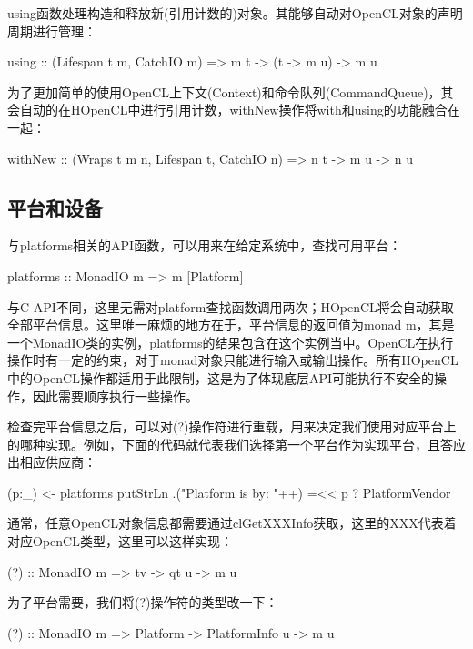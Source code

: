 using函数处理构造和释放新(引用计数的)对象。其能够自动对OpenCL对象的声明周期进行管理：

\begin{codebox}[haskell]
using :: (Lifespan t m, CatchIO m) => m t -> (t -> m u) -> m u
\end{codebox}

为了更加简单的使用OpenCL上下文(Context)和命令队列(CommandQueue)，其会自动的在HOpenCL中进行引用计数，withNew操作将with和using的功能融合在一起：

\begin{codebox}[haskell]
withNew :: (Wraps t m n, Lifespan t, CatchIO n) => n t -> m u -> n u
\end{codebox}

\subsection{平台和设备}

与platforms相关的API函数，可以用来在给定系统中，查找可用平台：

\begin{codebox}[haskell]
platforms :: MonadIO m => m [Platform]
\end{codebox}

与C API不同，这里无需对platform查找函数调用两次；HOpenCL将会自动获取全部平台信息。这里唯一麻烦的地方在于，平台信息的返回值为monad m，其是一个MonadIO类的实例，platforms的结果包含在这个实例当中。OpenCL在执行操作时有一定的约束，对于monad对象只能进行输入或输出操作。所有HOpenCL中的OpenCL操作都适用于此限制，这是为了体现底层API可能执行不安全的操作，因此需要顺序执行一些操作。

检查完平台信息之后，可以对(?)操作符进行重载，用来决定我们使用对应平台上的哪种实现。例如，下面的代码就代表我们选择第一个平台作为实现平台，且答应出相应供应商：

\begin{codebox}[haskell]
(p:_) <- platforms
putStrLn .("Platform is by: "++) =<< p ? PlatformVendor
\end{codebox}

通常，任意OpenCL对象信息都需要通过clGetXXXInfo获取，这里的XXX代表着对应OpenCL类型，这里可以这样实现：

\begin{codebox}[haskell]
(?) :: MonadIO m => tv -> qt u -> m u
\end{codebox}

为了平台需要，我们将(?)操作符的类型改一下：

\begin{codebox}[haskell]
(?) :: MonadIO m => Platform -> PlatformInfo u -> m u
\end{codebox}

